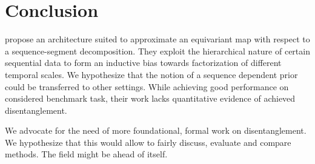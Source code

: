 \documentclass{article} %
\begin{document}
\section*{Conclusion}
\citet{hsu2017unsupervised} propose an architecture suited to approximate an equivariant map with respect to a sequence-segment decomposition. They exploit the hierarchical nature of certain sequential data to form an inductive bias towards factorization of different temporal scales. We hypothesize that the notion of a sequence dependent prior could be transferred to other settings. While achieving good performance on considered benchmark task, their work lacks quantitative evidence of achieved disentanglement.

We advocate for the need of more foundational, formal work on disentanglement. We hypothesize that this would allow to fairly discuss, evaluate and compare methods. The field might be ahead of itself. 


\newpage


\end{document}
